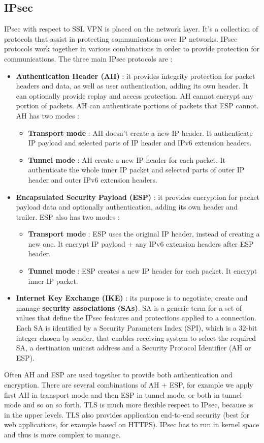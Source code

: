 \documentclass[11pt]{article}
\begin{document}
\subsection{IPsec}
IPsec with respect to SSL VPN is placed on the network layer. It's a collection of protocols that assist in protecting communications over IP networks. IPsec protocols work together in various combinations in order to provide protection for communications. The three main IPsec protocols are :
\begin{itemize}
\item \textbf{Authentication Header (AH)} : it provides integrity protection for packet headers and data, as well as user authentication, adding its own header. It can optionally provide replay and access protection. AH cannot encrypt any portion of packets. AH can authenticate portions of packets that ESP cannot. AH has two modes :
\begin{itemize}
\item \textbf{Transport mode} : AH doesn't create a new IP header. It authenticate IP payload and selected parts of IP header and IPv6 extension headers.
\item \textbf{Tunnel mode} : AH create a new IP header for each packet. It authenticate the whole inner IP packet and selected parts of outer IP header and outer IPv6 extension headers. 
\end{itemize}
\item \textbf{Encapsulated Security Payload (ESP)} : it provides encryption for packet payload data and optionally authentication, adding its own header and trailer. ESP also has two modes : 
\begin{itemize}
\item \textbf{Transport mode} : ESP uses the original IP header, instead of creating a new one. It encrypt IP payload + any IPv6 extension headers after ESP header.
\item \textbf{Tunnel mode} : ESP creates a new IP header for each packet. It encrypt inner IP packet.
\end{itemize}
\item \textbf{Internet Key Exchange (IKE)} : its purpose is to negotiate, create and manage \textbf{security associations (SAs)}. SA is a generic term for a set of values that define the IPsec features and protections applied to a connection. Each SA is identified by a Security Parameters Index (SPI), which is a 32-bit integer chosen by sender, that enables receiving system to select the required SA, a destination unicast address and a Security Protocol Identifier (AH or ESP).
\end{itemize}
Often AH and ESP are used together to provide both authentication and encryption. There are several combinations of AH + ESP, for example we apply first AH in transport mode and then ESP in tunnel mode, or both in tunnel mode and so on so forth. TLS is much more flexible respect to IPsec, because is in the upper levels. TLS also provides application end-to-end security (best for web applications, for example based on HTTPS). IPsec has to run in kernel space and thus is more complex to manage.
\end{document}
